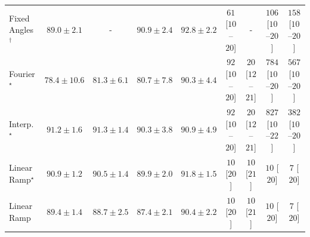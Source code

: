 \begin{tabular}{l|cccc|cccc|}
Fixed Angles$^\dagger$ & {\cellcolor[HTML]{045483}} \color[HTML]{F1F1F1} $89.0\pm 2.1$ & {\cellcolor[HTML]{000000}} \color[HTML]{F1F1F1} {\cellcolor{white}} \color{black} - & {\cellcolor[HTML]{034871}} \color[HTML]{F1F1F1} $90.9\pm 2.4$ & {\cellcolor[HTML]{023B5D}} \color[HTML]{F1F1F1} $92.8\pm 2.2$ & {\cellcolor[HTML]{FEEBE8}} \color[HTML]{000000} $61$ [$10$--$20$] & {\cellcolor[HTML]{000000}} \color[HTML]{F1F1F1} {\cellcolor{white}} \color{black} - & {\cellcolor[HTML]{FDE1DE}} \color[HTML]{000000} $106$ [$10$--$20$] & {\cellcolor[HTML]{FDD3CF}} \color[HTML]{000000} $158$ [$10$--$20$] \\
Fourier$^\star$ & {\cellcolor[HTML]{2D8ABD}} \color[HTML]{F1F1F1} $78.4\pm 10.6$ & {\cellcolor[HTML]{1379B5}} \color[HTML]{F1F1F1} $81.3\pm 6.1$ & {\cellcolor[HTML]{187CB6}} \color[HTML]{F1F1F1} $80.7\pm 7.8$ & {\cellcolor[HTML]{034B76}} \color[HTML]{F1F1F1} $90.3\pm 4.4$ & {\cellcolor[HTML]{FDE4E1}} \color[HTML]{000000} $92$ [$10$--$20$] & {\cellcolor[HTML]{FFF4F0}} \color[HTML]{000000} $20$ [$12$--$21$] & {\cellcolor[HTML]{5D006F}} \color[HTML]{F1F1F1} $784$ [$10$--$20$] & {\cellcolor[HTML]{C71D8C}} \color[HTML]{F1F1F1} $567$ [$10$--$20$] \\
Interp.$^\star$ & {\cellcolor[HTML]{03466E}} \color[HTML]{F1F1F1} $91.2\pm 1.6$ & {\cellcolor[HTML]{03456C}} \color[HTML]{F1F1F1} $91.3\pm 1.4$ & {\cellcolor[HTML]{034B76}} \color[HTML]{F1F1F1} $90.3\pm 3.8$ & {\cellcolor[HTML]{034871}} \color[HTML]{F1F1F1} $90.9\pm 4.9$ & {\cellcolor[HTML]{FDE4E1}} \color[HTML]{000000} $92$ [$10$--$20$] & {\cellcolor[HTML]{FFF4F0}} \color[HTML]{000000} $20$ [$12$--$21$] & {\cellcolor[HTML]{49006A}} \color[HTML]{F1F1F1} $827$ [$10$--$22$] & {\cellcolor[HTML]{F87AA8}} \color[HTML]{F1F1F1} $382$ [$10$--$20$] \\
Linear Ramp$^\star$ & {\cellcolor[HTML]{034871}} \color[HTML]{F1F1F1} $90.9\pm 1.2$ & {\cellcolor[HTML]{034A74}} \color[HTML]{F1F1F1} $90.5\pm 1.4$ & {\cellcolor[HTML]{034E7B}} \color[HTML]{F1F1F1} $89.9\pm 2.0$ & {\cellcolor[HTML]{034267}} \color[HTML]{F1F1F1} $91.8\pm 1.5$ & {\cellcolor[HTML]{FFF7F3}} \color[HTML]{000000} $10$ [$20$] & {\cellcolor[HTML]{FFF7F3}} \color[HTML]{000000} $10$ [$21$] & {\cellcolor[HTML]{FFF7F3}} \color[HTML]{000000} $10$ [$20$] & {\cellcolor[HTML]{FFF7F3}} \color[HTML]{000000} $7$ [$20$] \\
Linear Ramp & {\cellcolor[HTML]{045280}} \color[HTML]{F1F1F1} $89.4\pm 1.4$ & {\cellcolor[HTML]{045687}} \color[HTML]{F1F1F1} $88.7\pm 2.5$ & {\cellcolor[HTML]{045D92}} \color[HTML]{F1F1F1} $87.4\pm 2.1$ & {\cellcolor[HTML]{034B76}} \color[HTML]{F1F1F1} $90.4\pm 2.2$ & {\cellcolor[HTML]{FFF7F3}} \color[HTML]{000000} $10$ [$20$] & {\cellcolor[HTML]{FFF7F3}} \color[HTML]{000000} $10$ [$21$] & {\cellcolor[HTML]{FFF7F3}} \color[HTML]{000000} $10$ [$20$] & {\cellcolor[HTML]{FFF7F3}} \color[HTML]{000000} $7$ [$20$] \\

\end{tabular}
